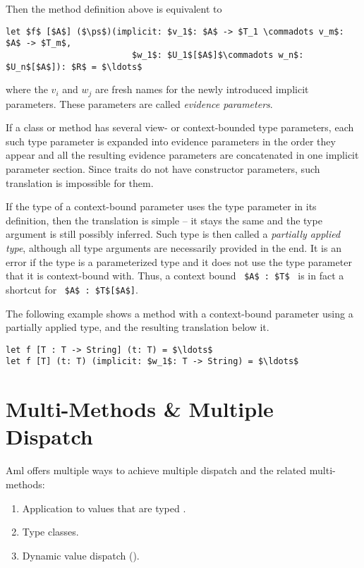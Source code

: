 Then the method definition above is equivalent to
\begin{lstlisting}
let $f$ [$A$] ($\ps$)(implicit: $v_1$: $A$ -> $T_1 \commadots v_m$: $A$ -> $T_m$,
                         $w_1$: $U_1$[$A$]$\commadots w_n$: $U_n$[$A$]): $R$ = $\ldots$
\end{lstlisting}
where the $v_i$ and $w_j$ are fresh names for the newly introduced implicit parameters. These parameters are called {\em evidence parameters}. 

If a class or method has several view- or context-bounded type parameters, each such type parameter is expanded into evidence parameters in the order they appear and all the resulting evidence parameters are concatenated in one implicit parameter section. Since traits do not have constructor parameters, such translation is impossible for them. 

If the type of a context-bound parameter uses the type parameter in its definition, then the translation is simple -- it stays the same and the type argument is still possibly inferred. Such type is then called a {\em partially applied type}, although all type arguments are necessarily provided in the end. It is an error if the type is a parameterized type and it does not use the type parameter that it is context-bound with. Thus, a context bound ~\lstinline!$A$ : $T$!~ is in fact a shortcut for ~\lstinline!$A$ : $T$[$A$]!. 

\example The following example shows a method with a context-bound parameter using a partially applied type, and the resulting translation below it. 
\begin{lstlisting}
let f [T : T -> String] (t: T) = $\ldots$
let f [T] (t: T) (implicit: $w_1$: T -> String) = $\ldots$
\end{lstlisting}





\section{Multi-Methods \& Multiple Dispatch}
\label{sec:multi-methods}

Aml offers multiple ways to achieve multiple dispatch and the related multi-methods: 

\begin{enumerate}
  \item Application to values that are typed .
  \item Type classes. 
  \item Dynamic value dispatch (). 
\end{enumerate}





